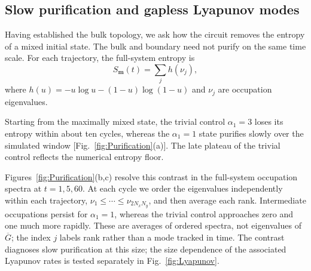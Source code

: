 \documentclass[aps,prb,10pt,twocolumn,superscriptaddress,longbibliography,floatfix]{revtex4-2}
\newcommand{\rec}{\mathbf m}   %
\begin{document}
{\color{blue}
\subsection{Slow purification and gapless Lyapunov modes}
\label{sec:Purification}

Having established the bulk topology, we ask how the circuit removes the entropy of a mixed initial state. The bulk and boundary need not purify on the same time scale. For each trajectory, the full-system entropy is
\begin{equation}
 S_{\rec}(t)=\sum_j h(\nu_j),
 \label{eq:BinaryEntropy}
\end{equation}
where $h(u)=-u\log u-(1-u)\log(1-u)$ and $\nu_j$ are occupation eigenvalues.

Starting from the maximally mixed state, the trivial control $\alpha_1=3$ loses its entropy within about ten cycles, whereas the $\alpha_1=1$ state purifies slowly over the simulated window [Fig.~\ref{fig:Purification}(a)]. The late plateau of the trivial control reflects the numerical entropy floor.

Figures~\ref{fig:Purification}(b,c) resolve this contrast in the full-system occupation spectra at $t=1,5,60$. At each cycle we order the eigenvalues independently within each trajectory, $\nu_1\leq\cdots\leq\nu_{2N_xN_y}$, and then average each rank. Intermediate occupations persist for $\alpha_1=1$, whereas the trivial control approaches zero and one much more rapidly. These are averages of ordered spectra, not eigenvalues of $\overline G$; the index $j$ labels rank rather than a mode tracked in time. The contrast diagnoses slow purification at this size; the size dependence of the associated Lyapunov rates is tested separately in Fig.~\ref{fig:Lyapunov}.


}
\end{document}
